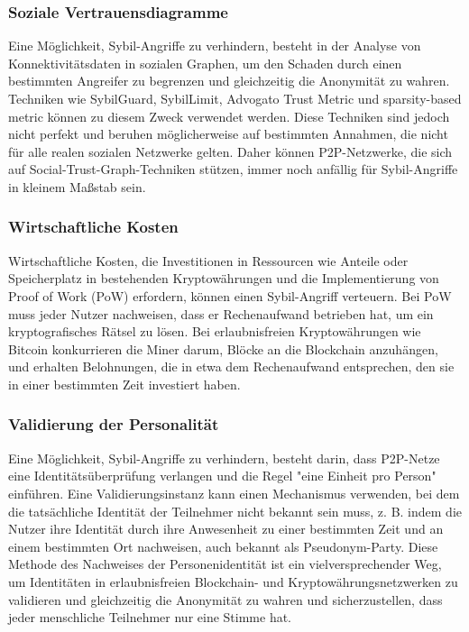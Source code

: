 \subsubsection{Soziale Vertrauensdiagramme}
Eine Möglichkeit, Sybil-Angriffe zu verhindern, besteht in der Analyse von Konnektivitätsdaten in sozialen Graphen, um den Schaden durch einen bestimmten Angreifer zu begrenzen und gleichzeitig die Anonymität zu wahren. Techniken wie SybilGuard, SybilLimit, Advogato Trust Metric und sparsity-based metric können zu diesem Zweck verwendet werden. Diese Techniken sind jedoch nicht perfekt und beruhen möglicherweise auf bestimmten Annahmen, die nicht für alle realen sozialen Netzwerke gelten. Daher können P2P-Netzwerke, die sich auf Social-Trust-Graph-Techniken stützen, immer noch anfällig für Sybil-Angriffe in kleinem Maßstab sein.
\subsubsection{Wirtschaftliche Kosten}
Wirtschaftliche Kosten, die Investitionen in Ressourcen wie Anteile oder Speicherplatz in bestehenden Kryptowährungen und die Implementierung von Proof of Work (PoW) erfordern, können einen Sybil-Angriff verteuern. Bei PoW muss jeder Nutzer nachweisen, dass er Rechenaufwand betrieben hat, um ein kryptografisches Rätsel zu lösen. Bei erlaubnisfreien Kryptowährungen wie Bitcoin konkurrieren die Miner darum, Blöcke an die Blockchain anzuhängen, und erhalten Belohnungen, die in etwa dem Rechenaufwand entsprechen, den sie in einer bestimmten Zeit investiert haben.
\subsubsection{Validierung der Personalität}
Eine Möglichkeit, Sybil-Angriffe zu verhindern, besteht darin, dass P2P-Netze eine Identitätsüberprüfung verlangen und die Regel "eine Einheit pro Person" einführen. Eine Validierungsinstanz kann einen Mechanismus verwenden, bei dem die tatsächliche Identität der Teilnehmer nicht bekannt sein muss, z. B. indem die Nutzer ihre Identität durch ihre Anwesenheit zu einer bestimmten Zeit und an einem bestimmten Ort nachweisen, auch bekannt als Pseudonym-Party. Diese Methode des Nachweises der Personenidentität ist ein vielversprechender Weg, um Identitäten in erlaubnisfreien Blockchain- und Kryptowährungsnetzwerken zu validieren und gleichzeitig die Anonymität zu wahren und sicherzustellen, dass jeder menschliche Teilnehmer nur eine Stimme hat.

